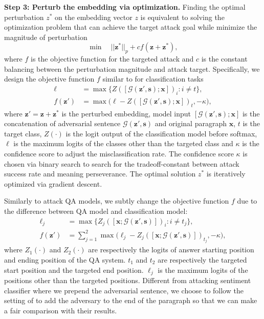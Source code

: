 \textbf{Step 3: Perturb the embedding via optimization.} Finding the optimal perturbation $z^*$ on the embedding vector $z$ is equivalent to solving the optimization problem that can achieve the target attack goal while minimize the magnitude of perturbation
\begin{equation}
    \min \quad ||\boldsymbol{z}^*||_p + c  f(\boldsymbol{z} + \boldsymbol{z}^*),
    \label{cw}
\end{equation}
where $f$ is the objective function for the targeted attack and $c$ is the constant balancing between the perturbation magnitude and attack target. Specifically, we design the objective function $f$ similar to \citet{cw} for classification tasks
\begin{align}
        \ell &=  \max\big\{Z\left({\left[\mathcal{G}(\boldsymbol{z}', \boldsymbol{s}); \boldsymbol{x} \right] }\right)_i:i \neq t \big\},  \\
        f(\boldsymbol{z}') &= \max \big(\ell - Z\left(\left[\mathcal{G}(\boldsymbol{z}', \boldsymbol{s}); \boldsymbol{x} \right] \right)_t  , -\kappa \big),
\end{align}
where $\boldsymbol{z}'=\boldsymbol{z}+\boldsymbol{z}^*$ is the perturbed embedding, model input $\left[\mathcal{G}(\boldsymbol{z}', \boldsymbol{s}); \boldsymbol{x} \right]$ is the concatenation of adversarial sentence $\mathcal{G}(\boldsymbol{z}', \boldsymbol{s})$ and original paragraph $\boldsymbol{x}$, $t$ is the target class, $Z(\cdot)$ is the logit output of the classification model before softmax, $\ell$ is the maximum logits of the classes other than the targeted class and $\kappa$ is the confidence score to adjust the misclassification rate. The confidence score $\kappa$ is chosen via binary search to search for the tradeoff-constant between attack success rate and meaning perseverance. The optimal solution $z^*$ is iteratively optimized via gradient descent.

Similarly to attack QA models, we subtly change the objective function $f$ due to the difference between QA model and classification model:
\begin{align*}
        \ell_j &=  \max\big\{Z_j\left({\left[\boldsymbol{x}; \mathcal{G}(\boldsymbol{z}', \boldsymbol{s}) \right] }\right)_i:i \neq t_j \big\},  \\
        f(\boldsymbol{z}') &= \sum_{j=1}^{2} \max \big(\ell_j - Z_j\left(\left[\boldsymbol{x}; \mathcal{G}(\boldsymbol{z}', \boldsymbol{s}) \right] \right)_{t_j}, -\kappa \big),
\end{align*}
where $Z_1(\cdot)$  and $Z_2(\cdot)$ are respectively the logits of answer starting position and ending position of the QA system. $t_1$ and $t_2$ are respectively the targeted start position and the targeted end position.  $\ell_j$ is the maximum logits of the positions other than the targeted positions. Different from attacking sentiment classifier where we prepend the adversarial sentence, we choose to follow the setting of \citeauthor{jia-liang-2017-adversarial} to add the adversary to the end of the paragraph so that we can make a fair comparison with their results.


